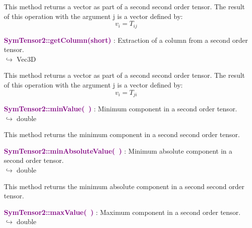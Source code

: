 This method returns a vector as part of a second second order tensor.
The result of this operation with the argument j is a vector defined by:
\begin{equation*}
v_{i} = T_{ij}
\end{equation*}

\textcolor{purple}{\textbf{SymTensor2::getColumn(short)}}\label{SymTensor2::getColumn(short)} : Extraction of a column from a second order tensor.\\ \hspace*{5mm}$\hookrightarrow$ Vec3D

This method returns a vector as part of a second second order tensor.
The result of this operation with the argument j is a vector defined by:
\begin{equation*}
v_{i} = T_{ji}
\end{equation*}

\textcolor{purple}{\textbf{SymTensor2::minValue(~)}}\label{SymTensor2::minValue()} : Minimum component in a second order tensor.\\ \hspace*{5mm}$\hookrightarrow$ double

This method returns the minimum component in a second second order tensor.

\textcolor{purple}{\textbf{SymTensor2::minAbsoluteValue(~)}}\label{SymTensor2::minAbsoluteValue()} : Minimum absolute component in a second order tensor.\\ \hspace*{5mm}$\hookrightarrow$ double

This method returns the minimum absolute component in a second second order tensor.

\textcolor{purple}{\textbf{SymTensor2::maxValue(~)}}\label{SymTensor2::maxValue()} : Maximum component in a second order tensor.\\ \hspace*{5mm}$\hookrightarrow$ double

